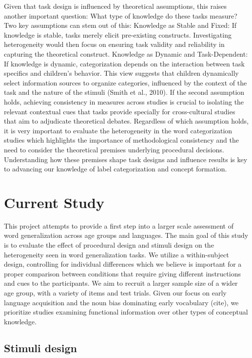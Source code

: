 \documentclass[10pt, letterpaper]{article}
\begin{document}
Given that task design is influenced by theoretical assumptions, this
raises another important question: What type of knowledge do these tasks
measure? Two key assumptions can stem out of this: Knowledge as Stable
and Fixed: If knowledge is stable, tasks merely elicit pre-existing
constructs. Investigating heterogeneity would then focus on ensuring
task validity and reliability in capturing the theoretical construct.
Knowledge as Dynamic and Task-Dependent: If knowledge is dynamic,
categorization depends on the interaction between task specifics and
children's behavior. This view suggests that children dynamically select
information sources to organize categories, influenced by the context of
the task and the nature of the stimuli (Smith et al., 2010). If the
second assumption holds, achieving consistency in measures across
studies is crucial to isolating the relevant contextual cues that tasks
provide specially for cross-cultural studies that aim to adjudicate
theoretical debates. Regardless of which assumption holds, it is very
important to evaluate the heterogeneity in the word categorization
studies which highlights the importance of methodological consistency
and the need to consider the theoretical premises underlying procedural
decisions. Understanding how these premises shape task designs and
influence results is key to advancing our knowledge of label
categorization and concept formation.

\hypertarget{current-study}{%
\section{Current Study}\label{current-study}}

This project attempts to provide a first step into a larger scale
assessment of word generalization across age groups and languages. The
main goal of this study is to evaluate the effect of procedural design
and stimuli design on the heterogeneity seen in word generalization
tasks. We utilize a within-subject design, controlling for individual
differences which we believe is important for a proper comparison
between conditions that require giving different instructions and cues
to the participants. We aim to recruit a larger sample size of a wider
age group, with a variety of items and test trials. Given our focus on
early language acquisition and the noun bias dominating early vocabulary
(cite), we prioritize studies examining functional information over
other types of conceptual knowledge.

\hypertarget{stimuli-design}{%
\subsection{Stimuli design}\label{stimuli-design}}
\end{document}
